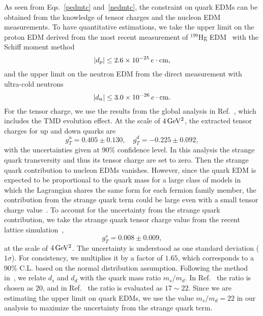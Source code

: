 \documentclass[aps,prd,twocolumn,groupedaddress,showpacs,superscriptaddress,floatfix,nofootinbib,10pt]{revtex4-1}
\begin{document}
As seen from Eqs.~\eqref{pedmtc} and~\eqref{nedmtc}, the constraint on quark EDMs can be obtained from the knowledge of tensor charges and the nucleon EDM measurements. To have quantitative estimations, we take the upper limit on the proton EDM derived from the most recent measurement of $^{199}$Hg EDM~\cite{Graner:2016ses} with the Schiff moment method
\begin{equation}
|d_p|\leq 2.6\times10^{-25}\,e\cdot{\rm cm},\label{current_dp}
\end{equation}
and the upper limit on the neutron EDM from the direct measurement with ultra-cold neutrons~\cite{Afach:2015sja}
\begin{equation}
|d_n|\leq 3.0\times10^{-26}\,e\cdot{\rm cm}.\label{current_dn}
\end{equation}
For the tensor charge, we use the results from the global analysis in Ref.~\cite{Ye:2016prn}, which includes the TMD evolution effect. At the scale of $4\,\rm GeV^2$, the extracted tensor charges for up and down quarks are 
\begin{equation}\label{current_gt}
g_T^{u}=0.405\pm0.130,\quad
g_T^{d}=-0.225\pm0.092,
\end{equation}
with the uncertainties given at 90\% confidence level. In this analysis the strange quark transversity and thus its tensor charge are set to zero. Then the strange quark contribution to nucleon EDMs vanishes. However, since the quark EDM is expected to be proportional to the quark mass for a large class of models in which the Lagrangian shares the same form for each fermion family member, the contribution from the strange quark term could be large even with a small tensor charge value~\cite{Bhattacharya:2015esa}. To account for the uncertainty from the strange quark contribution, we take the strange quark tensor charge value from the recent lattice simulation~\cite{Bhattacharya:2015esa},
\begin{equation}
g_T^s=0.008\pm0.009,
\end{equation}
at the scale of $4\,\rm GeV^2$. The uncertainty is understood as one standard deviation ($1\sigma$). For consistency, we multiplies it by a factor of $1.65$, which corresponds to a 90\% C.L. based on the normal distribution assumption. Following the method in~\cite{Bhattacharya:2015esa}, we relate $d_s$ and $d_d$ with the quark mass ratio $m_s/m_d$. In Ref.~\cite{Bhattacharya:2015esa} the ratio is chosen as 20, and in Ref.~\cite{Olive:2016xmw} the ratio is evaluated as $17\sim22$. Since we are estimating the upper limit on quark EDMs, we use the value $m_s/m_d=22$ in our analysis to maximize the uncertainty from the strange quark term.
\end{document}
